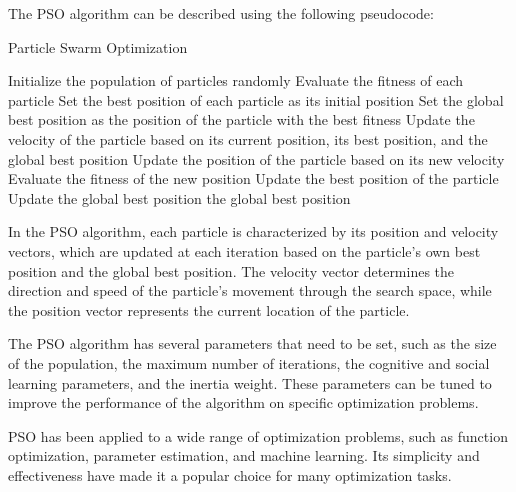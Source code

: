 The PSO algorithm can be described using the following pseudocode:

\begin{algorithm}[H]
\caption{Particle Swarm Optimization}
\label{alg:pso}
\begin{algorithmic}[1]
\State Initialize the population of particles randomly
\State Evaluate the fitness of each particle
\State Set the best position of each particle as its initial position
\State Set the global best position as the position of the particle with the best fitness
\State Update the velocity of the particle based on its current position, its best position, and the global best position
\State Update the position of the particle based on its new velocity
\State Evaluate the fitness of the new position
\State Update the best position of the particle
\EndIf
{}
\State Update the global best position
\EndIf
\EndFor
\EndWhile
\State \Return the global best position
\end{algorithmic}
\end{algorithm}

In the PSO algorithm, each particle is characterized by its position and velocity vectors, which are updated at each iteration based on the particle's own best position and the global best position. The velocity vector determines the direction and speed of the particle's movement through the search space, while the position vector represents the current location of the particle.

The PSO algorithm has several parameters that need to be set, such as the size of the population, the maximum number of iterations, the cognitive and social learning parameters, and the inertia weight. These parameters can be tuned to improve the performance of the algorithm on specific optimization problems.

PSO has been applied to a wide range of optimization problems, such as function optimization, parameter estimation, and machine learning. Its simplicity and effectiveness have made it a popular choice for many optimization tasks.






